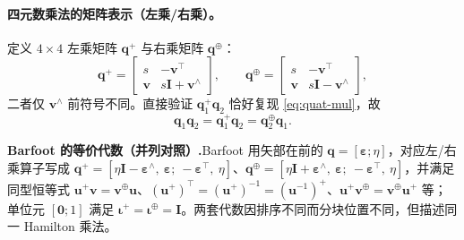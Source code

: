 \paragraph{四元数乘法的矩阵表示（左乘/右乘）。}定义 $4\times4$ 左乘矩阵 $\mathbf{q}^{+}$ 与右乘矩阵 $\mathbf{q}^{\oplus}$\cite{gaoxiang2019slam14}：
\begin{equation}
  \mathbf{q}^{+}=\begin{bmatrix}s&-\mathbf{v}^\top\\\mathbf{v}&s\mathbf{I}+\mathbf{v}^\wedge\end{bmatrix},\qquad
  \mathbf{q}^{\oplus}=\begin{bmatrix}s&-\mathbf{v}^\top\\\mathbf{v}&s\mathbf{I}-\mathbf{v}^\wedge\end{bmatrix},
  \label{eq:rb-quat-lr}
\end{equation}
二者仅 $\mathbf{v}^\wedge$ 前符号不同。直接验证 $\mathbf{q}_1^{+}\mathbf{q}_2$ 恰好复现 \cref{eq:quat-mul}，故
\begin{equation}
  \mathbf{q}_1\mathbf{q}_2=\mathbf{q}_1^{+}\mathbf{q}_2=\mathbf{q}_2^{\oplus}\mathbf{q}_1.
  \label{eq:rb-quat-lr-eq}
\end{equation}
\begin{note}
\textbf{Barfoot 的等价代数（并列对照）.}\;Barfoot 用矢部在前的 $\mathbf{q}=[\boldsymbol{\varepsilon};\eta]$，对应左/右乘算子写成 $\mathbf{q}^{+}=[\eta\mathbf{I}-\boldsymbol{\varepsilon}^\wedge,\ \boldsymbol{\varepsilon};\ -\boldsymbol{\varepsilon}^\top,\ \eta]$、$\mathbf{q}^{\oplus}=[\eta\mathbf{I}+\boldsymbol{\varepsilon}^\wedge,\ \boldsymbol{\varepsilon};\ -\boldsymbol{\varepsilon}^\top,\ \eta]$，并满足同型恒等式 $\mathbf{u}^{+}\mathbf{v}=\mathbf{v}^{\oplus}\mathbf{u}$、$(\mathbf{u}^{+})^\top=(\mathbf{u}^{+})^{-1}=(\mathbf{u}^{-1})^{+}$、$\mathbf{u}^{+}\mathbf{v}^{\oplus}=\mathbf{v}^{\oplus}\mathbf{u}^{+}$ 等；单位元 $[\mathbf{0};1]$ 满足 $\boldsymbol{\iota}^{+}=\boldsymbol{\iota}^{\oplus}=\mathbf{I}$。两套代数因排序不同而分块位置不同，但描述同一 Hamilton 乘法\cite{barfoot2024state}。
\end{note}

